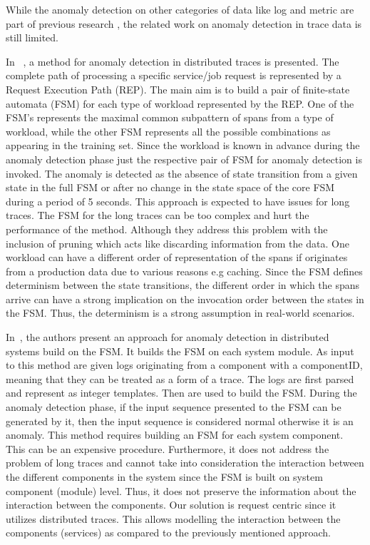 While the anomaly detection on other categories of data like log and metric are part of previous research \cite{8456348, 8457902,du2017deeplog, bezerra2013algorithms, brown2018recurrent, mining-invariants-from-console-logs-for-system-problem-detection, 6008688}, the  related work on anomaly detection in trace data is still limited.

In ~\cite{RepTrace}, a method for anomaly detection in distributed traces is presented. The complete path of processing a specific service/job request is represented by a Request Execution Path (REP). The main aim is to build a pair of finite-state automata (FSM) for each type of workload represented by the REP. One of the FSM’s represents the maximal common subpattern of spans from a type of workload, while the other FSM represents all the possible combinations as appearing in the training set. Since the workload is known in advance during the anomaly detection phase just the respective pair of FSM for anomaly detection is invoked. The anomaly is detected as the absence of state transition from a given state in the full FSM or after no change in the state space of the core FSM during a period of 5 seconds. 
This approach is expected to have issues for long traces. The FSM for the long traces can be too complex and hurt the performance of the method. Although they address this problem with the inclusion of pruning which acts like discarding information from the data. One workload can have a different order of representation of the spans if originates from a production data due to various reasons e.g caching. Since the FSM defines determinism between the state transitions, the different order in which the spans arrive can have a strong implication on the invocation order between the states in the FSM. Thus, the determinism is a strong assumption in real-world scenarios. 

In~\cite{fu2009execution}, the authors present an approach for anomaly detection in distributed systems build on the FSM. It builds the FSM on each system module. As input to this method are given logs originating from a component with a componentID, meaning that they can be treated as a form of a trace. The logs are first parsed and represent as integer templates. Then are used to build the FSM. During the anomaly detection phase, if the input sequence presented to the FSM can be generated by it, then the input sequence is considered normal otherwise it is an anomaly. 
This method requires building an FSM for each system component. This can be an expensive procedure. Furthermore, it does not address the problem of long traces and cannot take into consideration the interaction between the different components in the system since the FSM is built on system component (module) level. Thus, it does not preserve the information about the interaction between the components. Our solution is request centric since it utilizes distributed traces. This allows modelling the interaction between the components (services) as compared to the previously mentioned approach.

